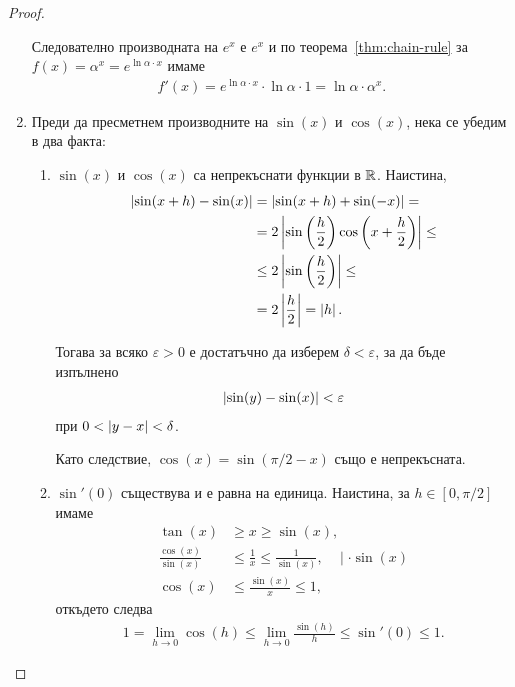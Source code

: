 \documentclass[numbers=endperiod, bibliography=totocnumbered]{scrartcl}
\begin{document}
\begin{proof}
\begin{enumerate}
    Следователно производната на \( e^x \) е \( e^x \) и по теорема~\ref{thm:chain-rule} за \( f(x) = \alpha^x = e^{\ln \alpha \cdot x} \) имаме
    \begin{align*}
      f'(x)
      =
      e^{\ln \alpha \cdot x} \cdot \ln \alpha \cdot 1
      =
      \ln \alpha \cdot \alpha^x.
    \end{align*}

    \item Преди да пресметнем производните на \( \sin(x) \) и \( \cos(x) \), нека се убедим в два факта:
    \begin{enumerate}
      \item \( \sin(x) \) и \( \cos(x) \) са непрекъснати функции в \( \mathbb{R} \). Наистина,
      \begin{align*}
        \left\vert \sin(x+h) - \sin(x) \right\vert
        &=
        \left\vert \sin(x+h) + \sin(-x) \right\vert
        = \\ &=
        2 \left\vert \sin\left(\frac h 2 \right) \cos \left( x+ \frac h 2 \right) \right\vert
        \leq \\ &\leq
        2 \left\vert \sin\left(\frac h 2 \right) \right\vert
        \leq \\ &=
        2 \left\vert \frac h 2 \right\vert
        =
        \left\vert h \right\vert.
      \end{align*}

      Тогава за всяко \( \varepsilon > 0 \) е достатъчно да изберем \( \delta < \varepsilon \), за да бъде изпълнено
      \begin{align*}
        \left\vert \sin(y) - \sin(x) \right\vert < \varepsilon
      \end{align*}
      при \( 0 < \left\vert y - x \right\vert < \delta \).

      Като следствие, \( \cos(x) = \sin(\pi / 2 - x) \) също е непрекъсната.

      \item \( \sin'(0) \) съществува и е равна на единица. Наистина, за \( h \in [0, \pi / 2] \) имаме
      \begin{align*}
        \tan(x) &\geq x \geq \sin(x),
        \\
        \frac {\cos(x)} {\sin(x)} &\leq \frac 1 x \leq \frac 1 {\sin(x)},~~~~\mid \cdot \sin(x)
        \\
        \cos(x) &\leq \frac {\sin(x)} x \leq 1,
      \end{align*}
      откъдето следва
      \begin{align*}
        1
        =
        \lim_{h \to 0} \cos(h)
        \leq
        \lim_{h \to 0} \frac {\sin(h)} h
        \leq
        \sin'(0)
        \leq
        1.
      \end{align*}
    \end{enumerate}


\end{enumerate}
\end{proof}
\end{document}
